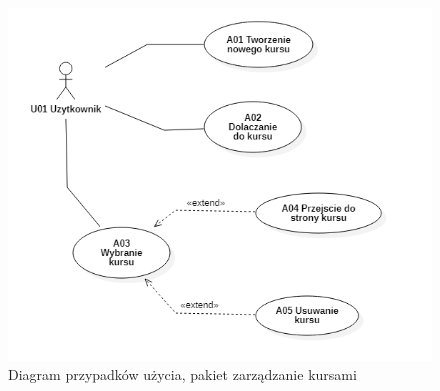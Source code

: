 
\begin{figure}[ht]
	\centering
	\includegraphics[scale=0.62]{img/chapter4/zarzadzanie_kurs.png}
	\caption{Diagram przypadków użycia, pakiet zarządzanie kursami}
	\label{chapter4_zarzadzanie_kurs}
\end{figure}

